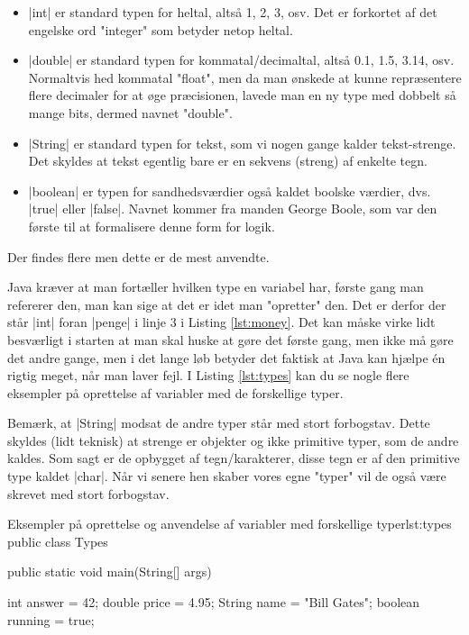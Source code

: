 {\begin{itemize}
	\item \JavaInline|int| er standard typen for heltal, altså 1, 2, 3, osv. Det er forkortet af det engelske ord "integer" som betyder netop heltal.
	\item \JavaInline|double| er standard typen for kommatal/decimaltal, altså 0.1, 1.5, 3.14, osv. Normaltvis hed kommatal "float", men da man ønskede at kunne repræsentere flere decimaler for at øge præcisionen, lavede man en ny type med dobbelt så mange bits, dermed navnet "double".
	\item \JavaInline|String| er standard typen for tekst, som vi nogen gange kalder tekst-strenge. Det skyldes at tekst egentlig bare er en sekvens (streng) af enkelte tegn.
	\item \JavaInline|boolean| er typen for sandhedsværdier også kaldet boolske værdier, dvs. \JavaInline|true| eller \JavaInline|false|. Navnet kommer fra manden George Boole, som var den første til at formalisere denne form for logik.
\end{itemize}

Der findes flere men dette er de mest anvendte.

Java kræver at man fortæller hvilken type en variabel har, første gang man refererer den, man kan sige at det er idet man "opretter" den. Det er derfor der står \JavaInline|int| foran \JavaInline|penge| i linje 3 i Listing \ref{lst:money}. Det kan måske virke lidt besværligt i starten at man skal huske at gøre det første gang, men ikke må gøre det andre gange, men i det lange løb betyder det faktisk at Java kan hjælpe én rigtig meget, når man laver fejl. I Listing \ref{lst:types} kan du se nogle flere eksempler på oprettelse af variabler med de forskellige typer.

\begin{remark}
	Bemærk, at \JavaInline|String| modsat de andre typer står med stort forbogstav. Dette skyldes (lidt teknisk) at strenge er objekter og ikke primitive typer, som de andre kaldes. Som sagt er de opbygget af tegn/karakterer, disse tegn er af den primitive type kaldet \JavaInline|char|. Når vi senere hen skaber vores egne "typer" vil de også være skrevet med stort forbogstav.
\end{remark}

\begin{JavaCode}{Eksempler på oprettelse og anvendelse af variabler med forskellige typer}{lst:types}
	public class Types {
		public static void main(String[] args) {
			int answer = 42;
			double price = 4.95;
			String name = "Bill Gates";
			boolean running = true;
			
}}
\end{JavaCode}}
